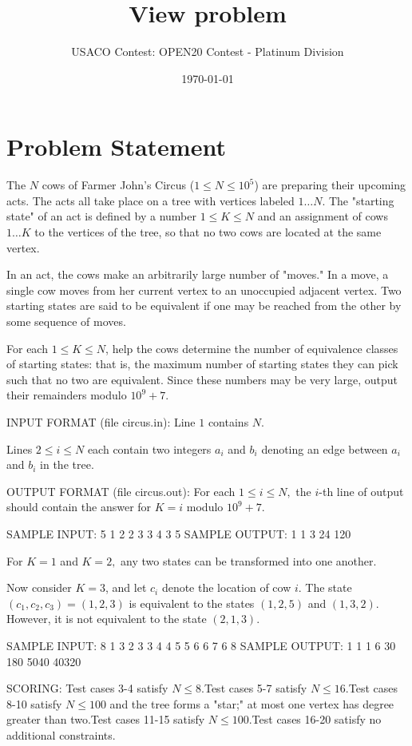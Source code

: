 \documentclass[12pt]{article}
\title{View problem}
\author{USACO Contest: OPEN20 Contest - Platinum Division}
\date{\today}
\begin{document}
\maketitle

\section*{Problem Statement}

The $N$ cows of Farmer John's Circus ($1 \leq N \leq 10^5$) are preparing their
upcoming acts. The acts all take place on a tree with vertices labeled
$1\ldots N$. The "starting state" of an act is defined by a number
$1 \leq K \leq N$ and an assignment of cows $1\dots K$ to the vertices of the
tree, so that no two cows are located at the same vertex.

In an act, the cows make an arbitrarily large number of "moves." In a move, a
single cow moves from her current vertex to an unoccupied adjacent vertex. Two
starting states are said to be equivalent if one may be reached from the other
by some sequence of moves.

For each $1 \leq K \leq N$, help the cows determine the number of equivalence
classes of starting states: that is, the maximum number of starting states they
can pick such that no two are equivalent. Since these numbers may be very large,
output their remainders modulo $10^9 + 7$.

INPUT FORMAT (file circus.in):
Line $1$ contains $N$.

Lines $2\le i\le N$ each contain two integers $a_i$ and $b_i$ denoting an edge
between $a_i$ and $b_i$ in the tree.

OUTPUT FORMAT (file circus.out):
For each $1\le i\le N,$ the $i$-th line of output should contain the answer for
$K=i$ modulo $10^9+7$.

SAMPLE INPUT:
5
1 2
2 3
3 4
3 5
SAMPLE OUTPUT: 
1
1
3
24
120

For $K=1$ and $K=2,$ any two states can be transformed into one another.

Now consider $K=3$, and let $c_i$ denote the location of cow $i$. The state
$(c_1,c_2,c_3)=(1,2,3)$ is equivalent to the states $(1,2,5)$ and $(1,3,2).$
However, it is not equivalent to the state $(2,1,3).$

SAMPLE INPUT:
8
1 3
2 3
3 4
4 5
5 6
6 7
6 8
SAMPLE OUTPUT: 
1
1
1
6
30
180
5040
40320

SCORING:
Test cases 3-4 satisfy $N\le 8.$Test cases 5-7 satisfy $N\le 16.$Test cases 8-10 satisfy $N\le 100$ and the tree forms a "star;" at most one
vertex has degree greater than two.Test cases 11-15 satisfy $N\le 100$.Test cases 16-20 satisfy no additional constraints.
\end{document}
